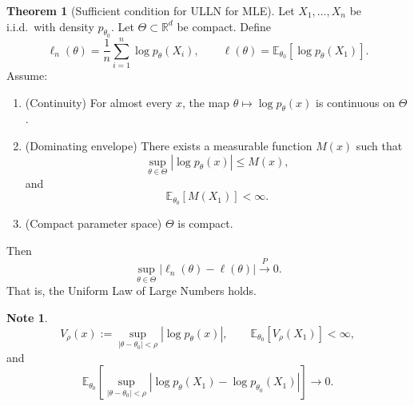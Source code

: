 \documentclass[11pt]{article}
\theoremstyle{definition}
\newtheorem{note}{Note}[section]
\newtheorem{theo}{Theorem}[section]
\begin{document}
\begin{theo}[Sufficient condition for ULLN for MLE]
Let $X_1, \dots, X_n$ be i.i.d.\ with density $p_{\theta_0}$.
Let $\Theta \subset \mathbb{R}^d$ be compact.
Define
\[
\ell_n(\theta)
=
\frac{1}{n}\sum_{i=1}^n \log p_\theta(X_i),
\qquad
\ell(\theta)
=
\mathbb{E}_{\theta_0}\!\left[\log p_\theta(X_1)\right].
\]
Assume:
\begin{enumerate}
\item[(1)] (Continuity) For almost every $x$, the map 
$\theta \mapsto \log p_\theta(x)$ is continuous on $\Theta$.
\item[(2)] (Dominating envelope) There exists a measurable function 
$M(x)$ such that
\[
\sup_{\theta \in \Theta}
\left| \log p_\theta(x) \right|
\le M(x),
\]
and
\[
\mathbb{E}_{\theta_0}[M(X_1)] < \infty.
\]
\item[(3)] (Compact parameter space) $\Theta$ is compact.
\end{enumerate}
Then
\[
\sup_{\theta \in \Theta}
\left|
\ell_n(\theta) - \ell(\theta)
\right|
\xrightarrow{P} 0.
\]
That is, the Uniform Law of Large Numbers holds.
\end{theo}
\begin{note}
\[
V_\rho(x)
:=
\sup_{|\theta-\theta_0|<\rho}
\left|
\log p_\theta(x)
\right|,
\qquad
\mathbb{E}_{\theta_0}[V_\rho(X_1)] < \infty,
\]
and
\[
\mathbb{E}_{\theta_0}
\left[
\sup_{|\theta-\theta_0|<\rho}
\left|
\log p_\theta(X_1)
-
\log p_{\theta_0}(X_1)
\right|
\right]
\to 0.
\]
\end{note}
\end{document}
